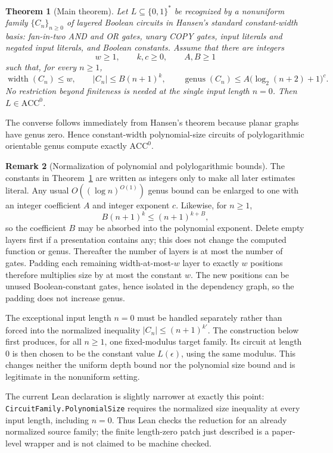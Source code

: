 \documentclass[11pt]{article}
\newtheorem{theorem}{Theorem}[section]
\theoremstyle{definition}
\newtheorem{remark}[theorem]{Remark}
\newcommand{\ACC}{\mathrm{ACC}^{0}}
\newcommand{\genus}{\operatorname{genus}}
\newcommand{\bits}{\{0,1\}}
\begin{document}
\begin{theorem}[Main theorem]\label{thm:main}
Let $L\subseteq\bits^*$ be recognized by a nonuniform family
$\{C_n\}_{n\ge 0}$ of layered Boolean circuits in Hansen's standard
constant-width basis: fan-in-two AND and OR gates, unary COPY gates, input
literals and negated input literals, and Boolean constants.  Assume that there
are integers
\[
  w\ge 1,\qquad k,c\ge 0,\qquad A,B\ge 1
\]
such that, for every $n\ge 1$,
\[
  \operatorname{width}(C_n)\le w,\qquad
  |C_n|\le B(n+1)^k,\qquad
  \genus(C_n)\le A\bigl(\log_2(n+2)+1\bigr)^c.
\]
No restriction beyond finiteness is needed at the single input length $n=0$.
Then $L\in\ACC$.
\end{theorem}

The converse follows immediately from Hansen's theorem because planar graphs
have genus zero.  Hence constant-width polynomial-size circuits of
polylogarithmic orientable genus compute exactly $\ACC$.

\begin{remark}[Normalization of polynomial and polylogarithmic bounds]\label{rem:normalization}
The constants in Theorem~\ref{thm:main} are written as integers only to make
all later estimates literal.  Any usual $O((\log n)^{O(1)})$ genus bound can
be enlarged to one with an integer coefficient $A$ and integer exponent $c$.
Likewise, for $n\ge1$,
\[
 B(n+1)^k\le (n+1)^{k+B},
\]
so the coefficient $B$ may be absorbed into the polynomial exponent.  Delete
empty layers first if a presentation contains any; this does not change the
computed function or genus.  Thereafter the number of layers is at most the
number of gates.  Padding each remaining width-at-most-$w$ layer to exactly
$w$ positions therefore multiplies size by at most the constant $w$.  The new
positions can be unused Boolean-constant gates, hence isolated in the
dependency graph, so the padding does not increase genus.

The exceptional input length $n=0$ must be handled separately rather than
forced into the normalized inequality $|C_n|\le(n+1)^{k'}$.  The construction
below first produces, for all $n\ge1$, one fixed-modulus target family.  Its
circuit at length $0$ is then chosen to be the constant value $L(\epsilon)$,
using the same modulus.  This changes neither the uniform depth bound nor the
polynomial size bound and is legitimate in the nonuniform setting.

The current Lean declaration is slightly narrower at exactly this point:
\nolinkurl{CircuitFamily.PolynomialSize} requires the normalized size inequality
at every input length, including $n=0$.  Thus Lean checks the reduction for an
already normalized source family; the finite length-zero patch just described
is a paper-level wrapper and is not claimed to be machine checked.
\end{remark}
\end{document}
